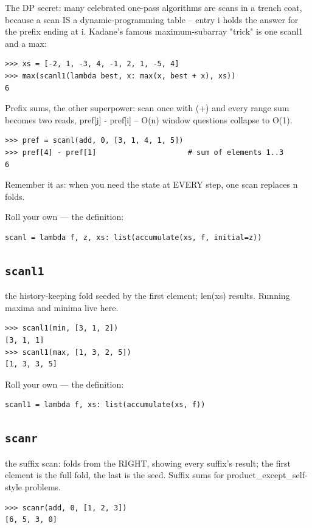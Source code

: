 \documentclass[10pt,letterpaper]{book}
\begin{document}
The DP secret: many celebrated one-pass algorithms are scans in a trench coat, because a scan IS a dynamic-programming table -- entry i holds the answer for the prefix ending at i. Kadane's famous maximum-subarray "trick" is one scanl1 and a max:

\begin{lstlisting}[style=ex]
>>> xs = [-2, 1, -3, 4, -1, 2, 1, -5, 4]
>>> max(scanl1(lambda best, x: max(x, best + x), xs))
6
\end{lstlisting}

Prefix sums, the other superpower: scan once with (+) and every range sum becomes two reads, pref[j] - pref[i] -- O(n) window questions collapse to O(1).

\begin{lstlisting}[style=ex]
>>> pref = scanl(add, 0, [3, 1, 4, 1, 5])
>>> pref[4] - pref[1]                     # sum of elements 1..3
6
\end{lstlisting}

Remember it as: when you need the state at EVERY step, one scan replaces n folds.


Roll your own --- the definition:

\begin{lstlisting}[style=ex]
scanl = lambda f, z, xs: list(accumulate(xs, f, initial=z))
\end{lstlisting}

\subsection{\texttt{scanl1}}\label{def:scanl1}
the history-keeping fold seeded by the first element; len(xs) results. Running maxima and minima live here.
\begin{lstlisting}[style=ex]
>>> scanl1(min, [3, 1, 2])
[3, 1, 1]
>>> scanl1(max, [1, 3, 2, 5])
[1, 3, 3, 5]
\end{lstlisting}

Roll your own --- the definition:

\begin{lstlisting}[style=ex]
scanl1 = lambda f, xs: list(accumulate(xs, f))
\end{lstlisting}
\subsection{\texttt{scanr}}\label{def:scanr}
the suffix scan: folds from the RIGHT, showing every suffix's result; the first element is the full fold, the last is the seed. Suffix sums for product\_except\_self-style problems.
\begin{lstlisting}[style=ex]
>>> scanr(add, 0, [1, 2, 3])
[6, 5, 3, 0]
\end{lstlisting}
\end{document}
